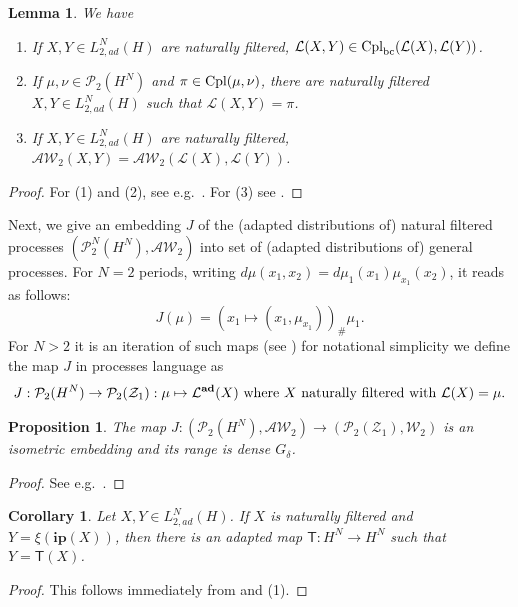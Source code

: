 \documentclass[a4paper]{amsart}
\numberwithin{theorem}{section}
\newtheorem{lemma}[theorem]{Lemma}
\newtheorem{proposition}[theorem]{Proposition}
\newtheorem{corollary}[theorem]{Corollary}
\theoremstyle{definition}
\newcommand{\law}{\mathcal{L}}
\newcommand{\cpl}{\textup{Cpl}}
\newcommand{\W}{\mathcal{W}}
\newcommand{\AW}{\mathcal{AW}}
\newcommand{\Pc}{\mathcal P}
\newcommand{\cplbc}{\cpl_{\rm bc}}
\renewcommand{\H}{H}
\newcommand{\Zc}{\mathcal{Z}}
\newcommand{\ipp}{\mathbf{ip}}
\newcommand{\lawadd}{\law^{\textnormal{\textbf{ad}}}}
\begin{document}
\begin{lemma}\label{lem:plainAW_bc}
We have 
    \begin{enumerate}
        \item If $X, Y \in L_{2,ad}^N(\H)$ are naturally filtered, $\law(X,Y) \in \cplbc(\law(X),\law(Y))$.
        \item If $\mu,\nu \in \Pc_2(H^N)$ and $\pi \in \cpl(\mu,\nu)$, there are naturally filtered $X,Y \in L_{2,ad}^N(\H)$ such that $\law(X,Y)=\pi$.
        \item If $X, Y \in L_{2,ad}^N(\H)$ are naturally filtered, $\AW_2(X,Y) = \AW_2(\law(X),\law(Y))$.
    \end{enumerate}
\end{lemma}
\begin{proof}
For (1) and (2), see e.g.\ \cite[Lemma 5.3]{BePfSc24}. For (3) see \cite[Theorem 1.2]{BaBePa21}.
\end{proof}
Next, we give an embedding $J$ of the (adapted distributions of) natural filtered processes $(\Pc_2^N(\H^N),\AW_2)$ into set of (adapted distributions of) general processes. For $N=2$ periods, writing $d\mu(x_1,x_2)=d\mu_1(x_1)\mu_{x_1}(x_2)$, it reads as follows:
\[
 J(\mu) =  (x_1 \mapsto (x_1, \mu_{x_1}))_\# \mu_1.
\]
For $N>2$ it is an iteration of such maps (see \cite{BaBaBeEd19b, BaBeEdPi17}) for notational simplicity we define the map $J$ in processes language as 
\begin{align}\label{eq:J}
J : \Pc_2(\H^N) \to \Pc_2(\Zc_1) : \mu \mapsto \lawadd(X) \text{ where $X$ naturally filtered with $\law(X)=\mu$}.
\end{align}

\begin{proposition}\label{prop:plainGdelta}
The map $J : (\Pc_2(\H^N),\AW_2) \to (\Pc_2(\Zc_1),\W_2)$ is an isometric embedding and its range is dense $G_\delta$. 
\end{proposition}
\begin{proof}
See e.g.\ \cite[Section 5]{BaBeEdPi17}.     
\end{proof}






\begin{corollary}
\label{cor:xitoT_natural}
Let $X, Y \in L_{2,ad}^N(\H)$. If $X$ is naturally filtered and  $Y = \xi(\ipp(X))$, then there is an adapted map $ \mathsf{T} : \H^N \to \H^N$ such that $Y =\mathsf{T}(X)$. 
\end{corollary}
\begin{proof}
This follows immediately from  and  (1).     
\end{proof}
\end{document}
